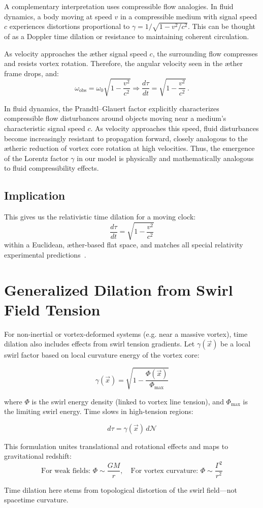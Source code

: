 A complementary interpretation uses compressible flow analogies. In fluid dynamics, a body moving at speed $v$ in a compressible medium with signal speed $c$ experiences distortions proportional to $\gamma = 1/\sqrt{1 - v^2/c^2}$. This can be thought of as a Doppler time dilation or resistance to maintaining coherent circulation. 

As velocity approaches the æther signal speed $c$, the surrounding flow compresses and resists vortex rotation. Therefore, the angular velocity seen in the æther frame drops, and:
\begin{equation}
\omega_\text{obs} = \omega_0 \sqrt{1 - \frac{v^2}{c^2}} \Rightarrow \frac{d\tau}{dt} = \sqrt{1 - \frac{v^2}{c^2}} \,.
\end{equation}

In fluid dynamics, the Prandtl–Glauert factor explicitly characterizes compressible flow disturbances around objects moving near a medium's characteristic signal speed $c$. As velocity approaches this speed, fluid disturbances become increasingly resistant to propagation forward, closely analogous to the ætheric reduction of vortex core rotation at high velocities. Thus, the emergence of the Lorentz factor $\gamma$ in our model is physically and mathematically analogous to fluid compressibility effects.

\subsection*{Implication}

This gives us the relativistic time dilation for a moving clock:
\[
\boxed{\frac{d\tau}{dt} = \sqrt{1 - \frac{v^2}{c^2}}}
\]
within a Euclidean, æther-based flat space, and matches all special relativity experimental predictions~\cite{Rado2020-æther-Lorentz,Levy2009-æther-clock}.

\section*{Generalized Dilation from Swirl Field Tension}\label{sec:generalized_dilation}

For non-inertial or vortex-deformed systems (e.g. near a massive vortex), time dilation also includes effects from swirl tension gradients. Let $\gamma(\vec{x})$ be a local swirl factor based on local curvature energy of the vortex core:

\[
\gamma(\vec{x}) = \sqrt{1 - \frac{\Phi(\vec{x})}{\Phi_{\text{max}}}}
\]

where $\Phi$ is the swirl energy density (linked to vortex line tension), and $\Phi_{\text{max}}$ is the limiting swirl energy. Time slows in high-tension regions:

\[
d\tau = \gamma(\vec{x})\, d\mathcal{N}
\]

This formulation unites translational and rotational effects and maps to gravitational redshift:
\[
\text{For weak fields: } \Phi \sim \frac{G M}{r}, \quad \text{For vortex curvature: } \Phi \sim \frac{\Gamma^2}{r^2}
\]

Time dilation here stems from topological distortion of the swirl field—not spacetime curvature.
